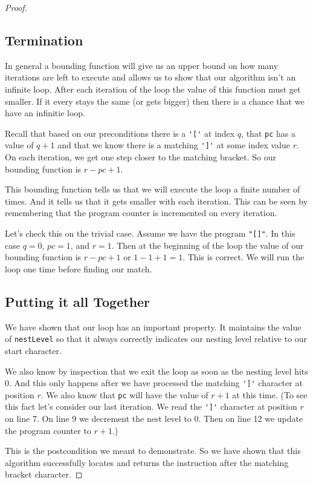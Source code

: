 \documentclass[10pt]{amsart}
\newcommand{\inl}{\lstinline[breaklines=true]}
\begin{document}
\begin{proof}
\subsection*{Termination}
In general a bounding function will give us an upper bound on how many 
iterations are left to execute and allows us to show that our algorithm isn't
an infinite loop. After each iteration of the loop the value of this 
function must get smaller. If it every stays the same (or gets bigger) then
there is a chance that we have an infinitie loop.

Recall that based on our preconditions there is a \inl!'['! at index $q$,
that \inl!pc! has a value of $q + 1$ and that we know there is a matching
\inl!']'! at some index value $r$. On each iteration, we get one step closer
to the matching bracket. So our bounding function is $r - pc + 1$.

This bounding function tells us that we will execute the loop a finite
number of times. And it tells us that it gets smaller with each iteration.
This can be seen by remembering that the program counter is incremented on
every iteration.

Let's check this on the trivial case. Assume we have the program
\inl!"[]"!. In this case $q=0$, $pc=1$, and $r=1$. Then at the beginning
of the loop the value of our bounding function is $r - pc + 1$ or
$1 - 1 + 1 = 1$. This is correct. We will run the loop one time before
finding our match.


\subsection*{Putting it all Together}
We have shown that our loop has an important property. It maintains the value
of \inl!nestLevel! so that it always correctly indicates our nesting level
relative to our start character. 

We also know by inspection that we exit the loop as soon as the nesting
level hits 0. And this only happens after we have processed the
matching \inl!']'! character at position $r$. We also know that 
\inl!pc! will have the value of $r+1$ at this time. (To see this fact
let's consider our last iteration. We read the \inl!']'! character at position
$r$ on line 7. On line 9 we decrement the nest level to 0. Then on line 12 we
update the program counter to $r+1$.)

This is the postcondition we meant to demonstrate. So we have shown that this
algorithm successfully locates and returns the instruction after the matching
bracket character.
\end{proof}
\end{document}
